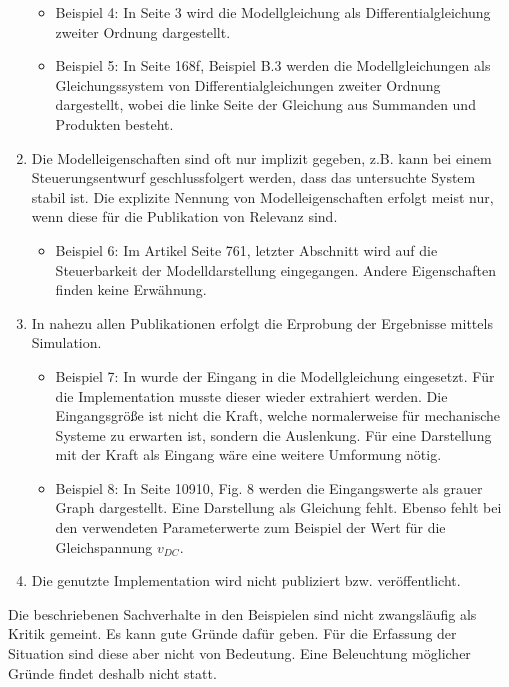 \begin{enumerate}
\begin{itemize}[label=$\bullet$]
		\item Beispiel 4: In \cite{BUT21} Seite 3 wird die Modellgleichung als Differentialgleichung zweiter Ordnung dargestellt.
		\item Beispiel 5: In \cite{KNO16} Seite 168f, Beispiel B.3 werden die Modellgleichungen als Gleichungssystem von Differentialgleichungen zweiter Ordnung dargestellt, wobei die linke Seite der Gleichung aus Summanden und Produkten besteht.
	\end{itemize}
	\item  Die Modelleigenschaften sind oft nur implizit gegeben, z.B. kann bei einem Steuerungsentwurf geschlussfolgert werden, dass das untersuchte System stabil ist. Die explizite Nennung von Modelleigenschaften erfolgt meist nur, wenn diese für die Publikation von Relevanz sind. 
	\begin{itemize}[label=$\bullet$]
		\item Beispiel 6: Im Artikel \cite{PEGUEA16} Seite 761, letzter Abschnitt wird auf die Steuerbarkeit der Modelldarstellung eingegangen. Andere Eigenschaften finden keine Erwähnung.
	\end{itemize}
	\item In nahezu allen Publikationen erfolgt die Erprobung der Ergebnisse mittels Simulation. 
	\begin{itemize}[label=$\bullet$]
		\item Beispiel 7: In \cite{BUT21} wurde der Eingang in die Modellgleichung eingesetzt. Für die Implementation musste dieser wieder extrahiert werden. Die Eingangsgröße ist nicht die Kraft, welche normalerweise für mechanische Systeme zu erwarten ist, sondern die Auslenkung. Für eine Darstellung mit der Kraft als Eingang wäre eine weitere Umformung nötig.
		\item Beispiel 8: In \cite{FEGE18} Seite 10910, Fig. 8 werden die Eingangswerte als grauer Graph dargestellt. Eine Darstellung als Gleichung fehlt. Ebenso fehlt bei den verwendeten Parameterwerte zum Beispiel der Wert für die Gleichspannung $v_{DC}$.
	\end{itemize}
	\item Die genutzte Implementation wird nicht publiziert bzw. veröffentlicht.
\end{enumerate}
Die beschriebenen Sachverhalte in den Beispielen sind nicht zwangsläufig als Kritik gemeint. Es kann gute Gründe dafür geben. Für die Erfassung der Situation sind diese aber nicht von Bedeutung. Eine Beleuchtung möglicher Gründe findet deshalb nicht statt.

